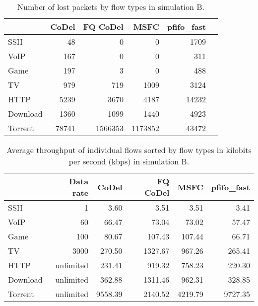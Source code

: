 \begin{table}
	\centering
	
	\begin{tabular}{@{}l|rrrrr@{}}
		\toprule
		& {CoDel} & {FQ CoDel} & {MSFC} & {pfifo\_fast}  \\ \midrule
		SSH       &    48         &    0          &    0          &    1709  \\
		VoIP      &    167        &    0          &    0          &    311   \\
		Game      &    197        &    3          &    0          &    488   \\
		TV        &    979        &    719        &    1009       &    3124  \\
		HTTP      &    5239       &    3670       &    4187       &    14232 \\
		Download  &    1360       &    1099       &    1440       &    4923  \\
		Torrent   &    78741      &    1566353    &    1173852    &    43472 \\ \bottomrule
	\end{tabular}
	\caption{Number of lost packets by flow types in simulation B.}
	\label{tab:loss_B}
\end{table}

\begin{table}
	\centering
	\begin{tabular}{@{}l|rrrrr@{}}
		\toprule
		         & {Data rate} & {CoDel} & {FQ CoDel} &  {MSFC} & {pfifo\_fast} \\ \midrule
		SSH      &           1 &    3.60 &       3.51 &    3.51 &          3.41 \\
		VoIP     &          60 &   66.47 &      73.04 &   73.02 &         57.47 \\
		Game     &         100 &   80.67 &     107.43 &  107.44 &         66.71 \\
		TV       &        3000 &  270.50 &    1327.67 &  967.26 &        265.41 \\
		HTTP     &   unlimited &  231.41 &     919.32 &  758.23 &        220.30 \\
		Download &   unlimited &  362.88 &    1311.46 &  962.31 &        328.85 \\
		Torrent  &   unlimited & 9558.39 &    2140.52 & 4219.79 &       9727.35 \\ \bottomrule
	\end{tabular}
	\caption{Average throughput of individual flows sorted by flow types in kilobits per second (kbps) in simulation B.}
	\label{tab:throughput_B}
\end{table}









